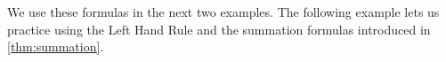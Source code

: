 We use these formulas in the next two examples.
%
%
%
%
%
The following example lets us practice using the Left Hand Rule and the summation formulas introduced in \autoref{thm:summation}.

